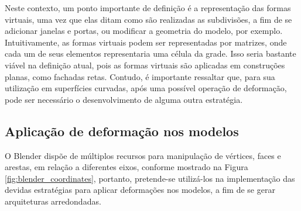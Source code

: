 \begin{figure}[h!]
	\centering
	\captionsetup{width=15cm}
	{}	
\end{figure}

Neste contexto, um ponto importante de definição é a representação das formas virtuais, uma vez que elas ditam como são realizadas as subdivisões, a fim de se adicionar janelas e portas, ou modificar a geometria do modelo, por exemplo. Intuitivamente, as formas virtuais podem ser representadas por matrizes, onde cada um de seus elementos representaria uma célula da grade. Isso seria bastante viável na definição atual, pois as formas virtuais são aplicadas em construções planas, como fachadas retas. Contudo, é importante ressaltar que, para sua utilização em superfícies curvadas, após uma possível operação de deformação, pode ser necessário o desenvolvimento de alguma outra estratégia.

\subsection{Aplicação de deformação nos modelos}
\label{sec:aplicacao}

O Blender dispõe de múltiplos recursos para manipulação de vértices, faces e arestas, em relação a diferentes eixos, conforme mostrado na Figura \ref{fig:blender_coordinates}, portanto, pretende-se utilizá-los na implementação das devidas estratégias para aplicar deformações nos modelos, a fim de se gerar arquiteturas arredondadas.

\begin{figure}[h!]
	\centering
	\captionsetup{width=15cm}
	{}	
\end{figure}

